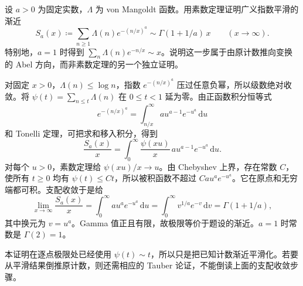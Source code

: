 \begin{exercise}\label{b3:ex:27-8}
设 \(a>0\) 为固定实数，\(\Lambda\) 为 von Mangoldt 函数。用素数定理证明广义指数平滑的渐近
\[
 S_a(x)\coloneqq\sum_{n\ge1}\Lambda(n)e^{-(n/x)^a}
       \sim\Gamma(1+1/a)\,x\qquad(x\to\infty).
\]
特别地，\(a=1\) 时得到 \(\sum_n\Lambda(n)e^{-n/x}\sim x\)。说明这一步属于由原计数推向变换的 Abel 方向，而非素数定理的另一个独立证明。
\end{exercise}
\begin{solution}
对固定 \(x>0\)，\(\Lambda(n)\le\log n\)，指数 \(e^{-(n/x)^a}\) 压过任意负幂，所以级数绝对收敛。将 \(\psi(t)=\sum_{n\le t}\Lambda(n)\) 在 \(0\le t<1\) 延为零。由正函数积分恒等式
\[
 e^{-(n/x)^a}
   =\int_{n/x}^\infty a u^{a-1}e^{-u^a}\,\mathrm du
\]
和 Tonelli 定理，可把求和移入积分，得到
\[
 \frac{S_a(x)}x
   =\int_0^\infty\frac{\psi(xu)}x\,
                       a u^{a-1}e^{-u^a}\,\mathrm du.
\]
对每个 \(u>0\)，素数定理给 \(\psi(xu)/x\to u\)。由 Chebyshev 上界，存在常数 \(C\)，使所有 \(t\ge0\) 均有 \(\psi(t)\le Ct\)，所以被积函数不超过
\(Ca u^a e^{-u^a}\)。它在原点和无穷端都可积。支配收敛于是给
\[
 \lim_{x\to\infty}\frac{S_a(x)}x
 =\int_0^\infty a u^a e^{-u^a}\,\mathrm du
 =\int_0^\infty v^{1/a}e^{-v}\,\mathrm dv
 =\Gamma(1+1/a),
\]
其中换元为 \(v=u^a\)。Gamma 值正且有限，故极限等价于题设的渐近。\(a=1\) 时常数是 \(\Gamma(2)=1\)。

本证明在逐点极限处已经使用 \(\psi(t)\sim t\)，所以只是把已知计数渐近平滑化。若要从平滑结果倒推原计数，则还需相应的 Tauber 论证，不能倒读上面的支配收敛步骤。
\end{solution}
